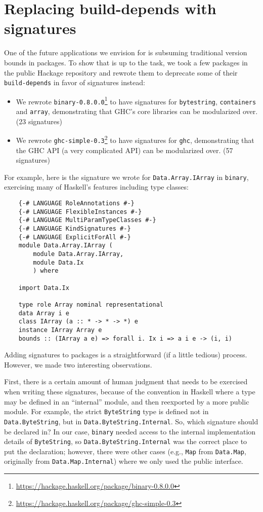 \section{Replacing build-depends with signatures}

One of the future applications we envision for \Backpack{} is subsuming
traditional version bounds in packages.  To show that \Backpack{} is up
to the task, we took a few packages in the public Hackage repository and
rewrote them to deprecate some of their \verb|build-depends| in favor of
signatures instead:

\begin{itemize}
    \item We rewrote \texttt{binary-0.8.0.0}\footnote{\smaller\url{https://hackage.haskell.org/package/binary-0.8.0.0}}
          to have signatures
          for \texttt{byte\-string}, \texttt{containers} and \texttt{array},
          demonstrating that GHC's core libraries can be modularized
          over. (23 signatures)

    \item We rewrote \texttt{ghc-simple-0.3}\footnote{\smaller\url{https://hackage.haskell.org/package/ghc-simple-0.3}} to have signatures
          for \texttt{ghc}, demonstrating that the GHC API (a very
          complicated API) can be modularized over. (57 signatures)
\end{itemize}
%
For example, here is the signature we wrote for
\texttt{Data.\allowbreak{}Array.\allowbreak{}IArray} in \texttt{binary},
exercising many of Haskell's features including type classes:

\begin{verbatim}
    {-# LANGUAGE RoleAnnotations #-}
    {-# LANGUAGE FlexibleInstances #-}
    {-# LANGUAGE MultiParamTypeClasses #-}
    {-# LANGUAGE KindSignatures #-}
    {-# LANGUAGE ExplicitForAll #-}
    module Data.Array.IArray (
        module Data.Array.IArray,
        module Data.Ix
        ) where

    import Data.Ix

    type role Array nominal representational
    data Array i e
    class IArray (a :: * -> * -> *) e
    instance IArray Array e
    bounds :: (IArray a e) => forall i. Ix i => a i e -> (i, i)
\end{verbatim}
%
Adding signatures to packages is a straightforward (if a little tedious)
process.  However, we made two interesting observations.

First, there is a certain amount of human judgment that needs to be
exercised when writing these signatures, because of the convention in
Haskell where a type may be defined in an ``internal'' module, and then
reexported by a more public module.  For example, the strict
\verb|ByteString| type is defined not in \verb|Data.ByteString|,
but in \verb|Data.ByteString.Internal|.  So, which signature should
be declared in?  In our case, \verb|binary| needed access to the
internal implementation details of \verb|ByteString|, so \verb|Data.ByteString.Internal|
was the correct place to put the declaration; however, there
were other cases (e.g., \verb|Map| from \verb|Data.Map|, originally
from \verb|Data.Map.Internal|) where we only used the public interface.

